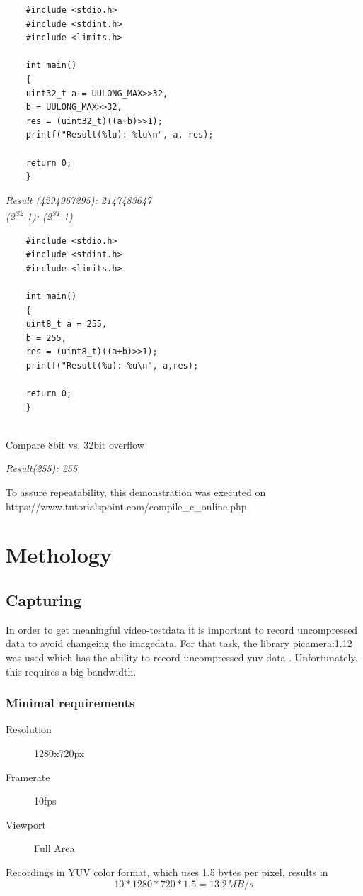 \begin{listing}[]
	
	\begin{verbatim}
	#include <stdio.h>
	#include <stdint.h>
	#include <limits.h>
	
	int main()
	{
	uint32_t a = UULONG_MAX>>32,
	b = UULONG_MAX>>32,
	res = (uint32_t)((a+b)>>1);
	printf("Result(%lu): %lu\n", a, res);
	
	return 0;
	}
	\end{verbatim}
	\textit{ Result (4294967295): 2147483647 \\
		(2\textsuperscript{32}-1): (2\textsuperscript{31}-1)
	}
	\begin{verbatim}
	#include <stdio.h>
	#include <stdint.h>
	#include <limits.h>
	
	int main()
	{
	uint8_t a = 255,
	b = 255,
	res = (uint8_t)((a+b)>>1);
	printf("Result(%u): %u\n", a,res);
	
	return 0;
	}
	
	\end{verbatim}
	\label{alg:the-code}
	\caption{Compare 8bit vs. 32bit overflow}
	\textit{ Result(255): 255 }
\end{listing}
To assure repeatability, this demonstration was executed on \\ https://www.tutorialspoint.com/compile\_c\_online.php.


\chapter{ Methology}
\section{Capturing}

In order to get meaningful video-testdata it is important to record uncompressed data to avoid changeing the imagedata. For that task, the library picamera:1.12 was used which has the ability to record uncompressed yuv data \cite{rawrecording}. Unfortunately, this requires a big bandwidth. 

\subsection{Minimal requirements}
\begin{description}
	\item[Resolution] 1280x720px
	\item[Framerate] 10fps
	\item[Viewport] Full Area
\end{description}
Recordings in YUV color format, which uses 1.5 bytes per pixel, results in
$$10 * 1280 * 720 * 1.5 = 13.2 MB/s$$

